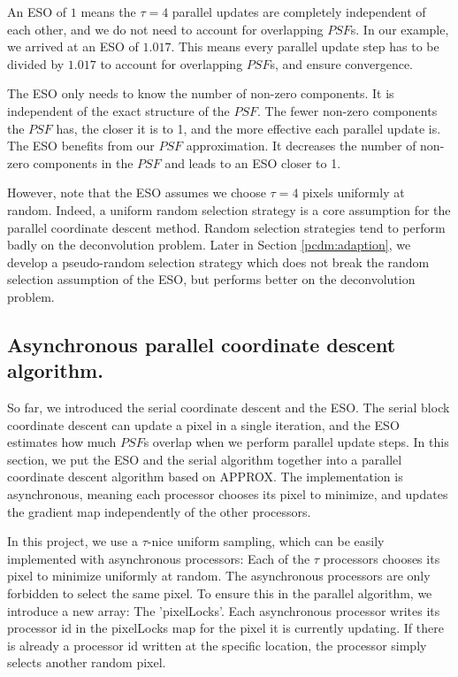 An ESO of $1$ means the $\tau = 4$ parallel updates are completely independent of each other, and we do not need to account for overlapping $PSF$s. In our example, we arrived at an ESO of $1.017$. This means every parallel update step has to be divided by $1.017$ to account for overlapping $PSF$s, and ensure convergence.

The ESO only needs to know the number of non-zero components. It is independent of the exact structure of the $PSF$. The fewer non-zero components the $PSF$ has, the closer it is to 1, and the more effective each parallel update is. The ESO benefits from our $PSF$ approximation. It decreases the number of non-zero components in the $PSF$ and leads to an ESO closer to 1.

However, note that the ESO assumes we choose $\tau = 4$ pixels uniformly at random. Indeed, a uniform random selection strategy is a core assumption for the parallel coordinate descent method\cite{richtarik2016parallel}. Random selection strategies tend to perform badly on the deconvolution problem. Later in Section \ref{pcdm:adaption}, we develop a pseudo-random selection strategy which does not break the random selection assumption of the ESO, but performs better on the deconvolution problem.


\subsection{Asynchronous parallel coordinate descent algorithm.}\label{pcdm:async}
So far, we introduced the serial coordinate descent and the ESO. The serial block coordinate descent can update a pixel in a single iteration, and the ESO estimates how much $PSF$s overlap when we perform parallel update steps. In this section, we put the ESO and the serial algorithm together into a parallel coordinate descent algorithm based on APPROX\cite{fercoq2015accelerated}. The implementation is asynchronous, meaning each processor chooses its pixel to minimize, and updates the gradient map independently of the other processors.

In this project, we use a $\tau$-nice uniform sampling, which can be easily implemented with asynchronous processors: Each of the $\tau$ processors chooses its pixel to minimize uniformly at random. The asynchronous processors are only forbidden to select the same pixel. To ensure this in the parallel algorithm, we introduce a new array: The 'pixelLocks'. Each asynchronous processor writes its processor id in the pixelLocks map for the pixel it is currently updating. If there is already a processor id written at the specific location, the processor simply selects another random pixel. 


